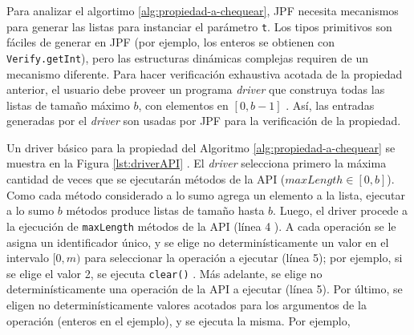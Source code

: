 Para analizar el algortimo \ref{alg:propiedad-a-chequear}, JPF necesita mecanismos para generar
las listas para instanciar el parámetro \texttt{t}. 
Los tipos primitivos son fáciles de generar en JPF (por ejemplo, los enteros se
obtienen con \texttt{Verify.getInt}), pero las estructuras dinámicas complejas
requiren de un mecanismo diferente. Para hacer verificación exhaustiva acotada
de la propiedad anterior, el usuario debe proveer un programa \emph{driver} que construya todas las 
listas de tamaño máximo \(b\), con elementos en \([0,b-1]\) . Así, las entradas generadas por el
\emph{driver} son usadas por JPF para la verificación de la propiedad.

Un driver básico para la propiedad del Algoritmo \ref{alg:propiedad-a-chequear} se
muestra en la Figura \ref{lst:driverAPI} . 
El \emph{driver} selecciona primero la máxima cantidad de veces que se
ejecutarán métodos de la API (\(maxLength \in [0,b]\)). Como cada método considerado a lo sumo
agrega un elemento a la lista, ejecutar a lo sumo \(b\) métodos produce listas de
tamaño hasta \(b\). Luego, el driver procede a la ejecución de \texttt{maxLength} 
métodos de la API (línea 4 ). A cada operación se le asigna un
identificador único, y se elige no determinísticamente un valor en el intervalo \([0, m)\) para
seleccionar la operación a ejecutar (línea 5); por ejemplo, si
se elige el valor 2, se ejecuta \texttt{clear()} .
Más adelante, se elige no determinísticamente
una operación de la API a ejecutar (línea 5). Por último, se eligen no
determinísticamente valores acotados para los argumentos de la operación
(enteros en el ejemplo), y se ejecuta la misma. Por ejemplo, 



